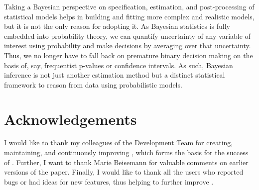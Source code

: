 \documentclass[jss]{jss}
\begin{document}
Taking a Bayesian perspective on specification, estimation, and
post-processing of statistical models helps in building and fitting more
complex and realistic models, but it is not the only reason for adopting
it. As Bayesian statistics is fully embedded into probability theory, we
can quantify uncertainty of any variable of interest using probability
and make decisions by averaging over that uncertainty. Thus, we no
longer have to fall back on premature binary decision making on the
basis of, say, frequentist p-values or confidence intervals. As such,
Bayesian inference is not just another estimation method but a distinct
statistical framework to reason from data using probabilistic models.

\hypertarget{acknowledgements}{%
\section{Acknowledgements}\label{acknowledgements}}

I would like to thank my colleagues of the  Development
Team for creating, maintaining, and continuously improving
, which forms the basis for the success of .
Further, I want to thank Marie Beisemann for valuable comments on
earlier versions of the paper. Finally, I would like to thank all the
users who reported bugs or had ideas for new features, thus helping to
further improve .

\renewcommand\refname{References}

\end{document}
